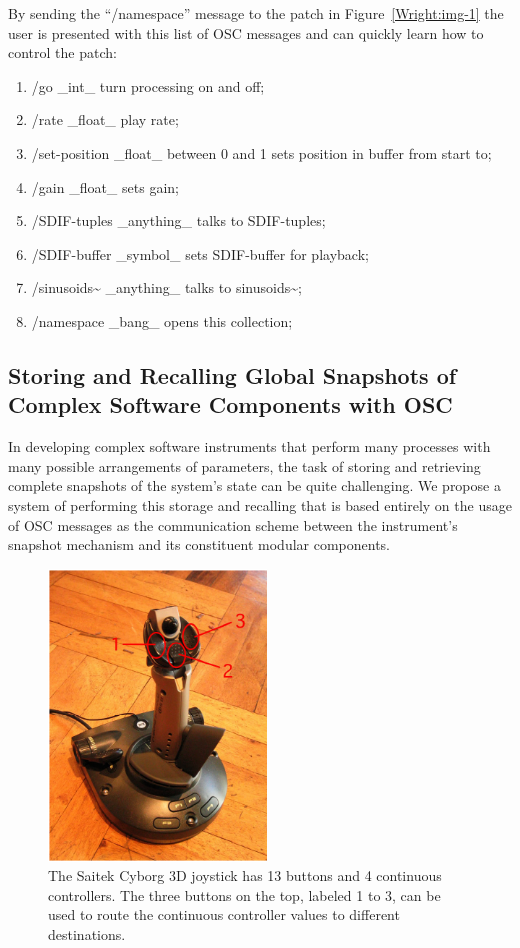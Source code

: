By sending the ``/namespace'' message to the patch in Figure~\ref{Wright:img-1} the user is
presented with this list of OSC messages and can quickly learn how to control the
patch:

\begin{enumerate}
\item /go \_int\_ turn processing on and off;
\item /rate \_float\_ play rate;
\item /set-position \_float\_ between 0 and 1 sets position in buffer from start to;
\item /gain \_float\_ sets gain;
\item /SDIF-tuples \_anything\_ talks to SDIF-tuples;
\item /SDIF-buffer \_symbol\_ sets SDIF-buffer for playback;
\item /sinusoids\textasciitilde{} \_anything\_ talks to sinusoids\textasciitilde{};
\item /namespace \_bang\_ opens this collection;
\end{enumerate}

\subsection{Storing and Recalling Global Snapshots of Complex Software
Components with OSC}

In developing complex software instruments that perform many processes with many
possible arrangements of parameters, the task of storing and retrieving complete
snapshots of the system's state can be quite challenging.  We propose a system of
performing this storage and recalling that is based entirely on the usage of OSC
messages as the communication scheme between the instrument's snapshot mechanism
and its constituent modular components.


\begin{figure}[t]
\centering
\includegraphics[width=58mm]{img-6-eps-converted-to-crop.pdf}
\caption{The Saitek Cyborg 3D joystick has 13 buttons and 4 continuous controllers. The three buttons on the top, labeled 1 to 3, can be used to route the continuous controller values to different destinations.}
\label{Wright:img-6}       %
\end{figure}



